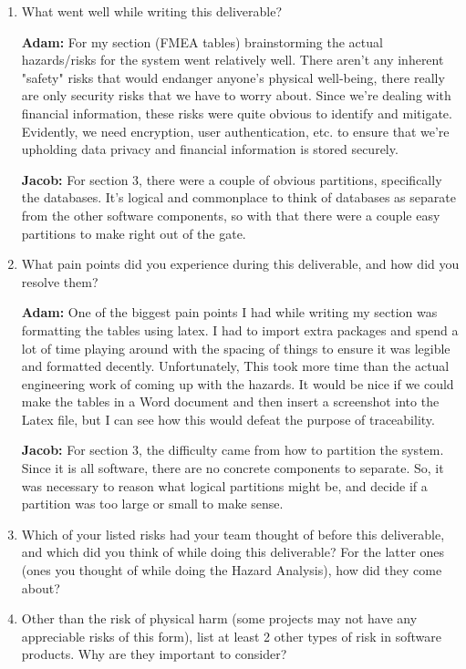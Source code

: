 \documentclass{article}
\begin{document}
\begin{enumerate}
    \item What went well while writing this deliverable? 

    \textbf{Adam:} For my section (FMEA tables) brainstorming the actual hazards/risks for the system went relatively well. There aren't any inherent "safety" risks that would endanger anyone's physical well-being, there really are only security risks that we have to worry about. Since we're dealing with financial information, these risks were quite obvious to identify and mitigate. Evidently, we need encryption, user authentication, etc. to ensure that we're upholding data privacy and financial information is stored securely.

    \textbf{Jacob:} For section 3, there were a couple of obvious partitions, specifically the databases. It's logical and commonplace to think of databases as separate from the other software components, so with that there were a couple easy partitions to make right out of the gate.
    \item What pain points did you experience during this deliverable, and how
    did you resolve them?

    \textbf{Adam:} One of the biggest pain points I had while writing my section was formatting the tables using latex. I had to import extra packages and spend a lot of time playing around with the spacing of things to ensure it was legible and formatted decently. Unfortunately, This took more time than the actual engineering work of coming up with the hazards. It would be nice if we could make the tables in a Word document and then insert a screenshot into the Latex file, but I can see how this would defeat the purpose of traceability.

    \textbf{Jacob:} For section 3, the difficulty came from how to partition the system. Since it is all software, there are no concrete components to separate. So, it was necessary to reason what logical partitions might be, and decide if a partition was too large or small to make sense.

    \item Which of your listed risks had your team thought of before this
    deliverable, and which did you think of while doing this deliverable? For
    the latter ones (ones you thought of while doing the Hazard Analysis), how
    did they come about?
    \item Other than the risk of physical harm (some projects may not have any
    appreciable risks of this form), list at least 2 other types of risk in
    software products. Why are they important to consider?


\end{enumerate}
\end{document}
